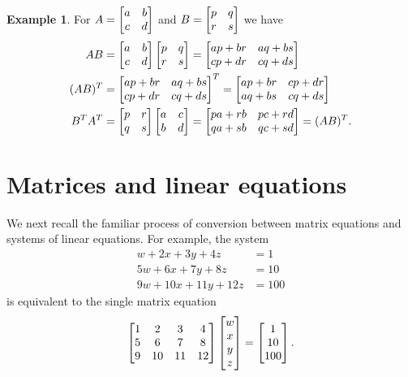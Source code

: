 \documentclass[reqno]{amsart}
\theoremstyle{definition}
\newtheorem{example}[theorem]{Example}
\begin{document}
\begin{example}\label{eg-transpose-anti}
 For $A=\left[\begin{matrix} a & b \\ c & d \end{matrix}\right]$ and $B=\left[\begin{matrix} p & q \\ r & s \end{matrix}\right]$ we
 have
 \begin{align*}
  AB &= \left[\begin{matrix} a & b \\ c & d \end{matrix}\right] \left[\begin{matrix} p & q \\ r & s \end{matrix}\right]
      = \left[\begin{matrix} ap+br & aq+bs \\ cp+dr & cq+ds \end{matrix}\right] \\
  (AB)^T &= \left[\begin{matrix} ap+br & aq+bs \\ cp+dr & cq+ds \end{matrix}\right]^T
          = \left[\begin{matrix} ap+br & cp+dr \\ aq+bs & cq+ds \end{matrix}\right] \\
  B^TA^T &= \left[\begin{matrix} p & r \\ q & s \end{matrix}\right] \left[\begin{matrix} a & c \\ b & d \end{matrix}\right]
          = \left[\begin{matrix} pa+rb & pc+rd \\ qa+sb & qc+sd \end{matrix}\right]
          = (AB)^T.
 \end{align*}
\end{example}

\section{Matrices and linear equations}
\label{sec-lineq}

We next recall the familiar process of conversion between
matrix equations and systems of linear equations.  
For example, the system
\begin{align*}
  w +  2x +  3y +  4z &= 1 \\
 5w +  6x +  7y +  8z &= 10 \\
 9w + 10x + 11y + 12z &= 100
\end{align*}
is equivalent to the single matrix equation
\[ \left[\begin{matrix} 1 & 2  & 3  & 4 \\
        5 & 6  & 7  & 8 \\
        9 & 10 & 11 & 12 \end{matrix}\right]
   \left[\begin{matrix} w \\ x \\ y \\ z \end{matrix}\right] =
   \left[\begin{matrix} 1 \\ 10 \\ 100 \end{matrix}\right].
\]
\end{document}
